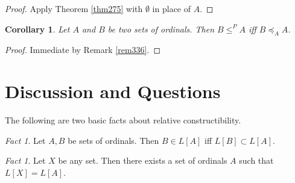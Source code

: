 \documentclass[12pt, twoside]{memoir}
\numberwithin{equation}{section}
\newtheorem{cor}[thm]{Corollary}
\theoremstyle{definition}
\theoremstyle{remark}
\newtheorem{fact}[thm]{Fact}
\theoremstyle{definition}
\theoremstyle{definition}
\theoremstyle{definition}
\theoremstyle{remark}
\begin{document}
\begin{proof}
Apply Theorem \ref{thm275} with $\emptyset$ in place of $A$. 
\end{proof}

\begin{cor}\label{cor8343}
Let $A$ and $B$ be two sets of ordinals. Then $B \leq^P A$ iff $B \preceq_A A$.
\end{cor}

\begin{proof}
Immediate by Remark \ref{rem336}.
\end{proof}

\section{Discussion and Questions}

The following are two basic facts about relative constructibility.

\begin{fact}\label{fact276}
Let $A, B$ be sets of ordinals. Then $B \in L[A]$ iff $L[B] \subset L[A]$.
\end{fact}

\begin{fact}\label{fact277}
Let $X$ be any set. Then there exists a set of ordinals $A$ such that $L[X] = L[A]$.
\end{fact}
\end{document}
